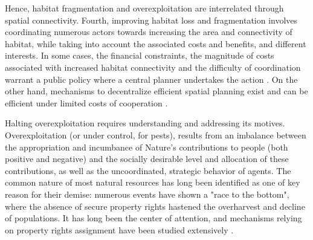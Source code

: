  Hence, habitat fragmentation and overexploitation are interrelated through spatial connectivity. Fourth, improving habitat loss and fragmentation involves coordinating numerous actors towards increasing the area and connectivity of habitat, while taking into account the associated costs and benefits, and different interests.
 In some cases, the financial constraints, the magnitude of costs associated with increased habitat connectivity and the difficulty of coordination warrant a public policy where a central planner undertakes the action \citep{Mouysset2012}. On the other hand, mechanisms to decentralize efficient spatial planning exist and can be efficient under limited costs of cooperation \citep{costello_private_2017, bareille_agglomeration_2023}. 
 
	Halting overexploitation requires understanding and addressing its motives. Overexploitation (or under control, for pests), results from an imbalance between the appropriation and incumbance of Nature's contributions to people (both positive and negative) and the socially desirable level and allocation of these contributions, as well as the uncoordinated, strategic behavior of agents. 	
	The common nature of most natural resources \citep{Gordon1954, smith_models_1969} has long been identified as one of key reason for their demise: numerous events have shown a "race to the bottom", where the absence of secure property rights hastened the overharvest and decline of populations. It has long been the center of attention, and mechanisms relying on property rights assignment have been studied extensively \citep{libecap_tragedy_2009, costello_partial_2015, isaksen_tragedy_2019}.
	
